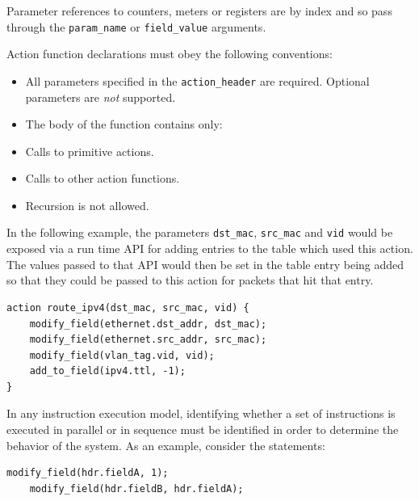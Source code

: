 \documentclass[12pt]{article}
\begin{document}
Parameter references to counters, meters or registers are by index and so 
pass through the \texttt{param_name} or \texttt{field_value} arguments.

Action function declarations must obey the following conventions:

\begin{itemize}
\item
All parameters specified in the \texttt{action_header} are required. Optional parameters 
are \textit{not} supported.
\item
The body of the function contains only:
\end{itemize}

\begin{itemize}
\item
Calls to primitive actions.
\item
Calls to other action functions.
\end{itemize}

\begin{itemize}
\item
Recursion is not allowed.
\end{itemize}


In the following example, the parameters \texttt{dst_mac}, \texttt{src_mac} and \texttt{vid} would 
be exposed via a run time API for adding entries to the table which used this 
action. The values passed to that API would then be set in the table entry 
being added so that they could be passed to this action for packets that hit 
that entry.

\begin{lstlisting}[keywords={},frame=single,escapechar=\@]
action route_ipv4(dst_mac, src_mac, vid) {
    modify_field(ethernet.dst_addr, dst_mac);
    modify_field(ethernet.src_addr, src_mac);
    modify_field(vlan_tag.vid, vid);
    add_to_field(ipv4.ttl, -1);
}
\end{lstlisting}


In any instruction execution model, identifying whether a set of instructions 
is executed in parallel or in sequence must be identified in order to determine 
the behavior of the system. As an example, consider the statements:

\begin{lstlisting}[keywords={},frame=single,escapechar=\@]
    modify_field(hdr.fieldA, 1);
    modify_field(hdr.fieldB, hdr.fieldA);
\end{lstlisting}
\end{document}
